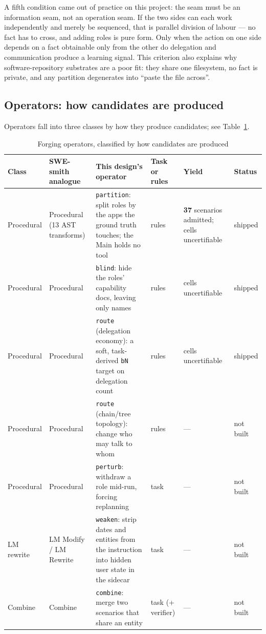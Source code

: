 \documentclass[11pt,a4paper]{article}
\begin{document}
A fifth condition came out of practice on this project: the seam must be an information seam, not an operation seam. If the two sides can each work independently and merely be sequenced, that is parallel division of labour --- no fact has to cross, and adding roles is pure form. Only when the action on one side depends on a fact obtainable only from the other do delegation and communication produce a learning signal. This criterion also explains why software-repository substrates are a poor fit: they share one filesystem, no fact is private, and any partition degenerates into ``paste the file across''.

\subsection{Operators: how candidates are produced}
\label{sec:operators}

Operators fall into three classes by how they produce candidates; see Table~\ref{tab:operators}.

\begin{table}[H]
\centering
\small
\caption{Forging operators, classified by how candidates are produced}
\label{tab:operators}
\begin{tabularx}{\textwidth}{>{\raggedright\arraybackslash}p{1.75cm} >{\raggedright\arraybackslash}p{1.85cm} X >{\raggedright\arraybackslash}p{1.5cm} >{\raggedright\arraybackslash}p{1.85cm} >{\raggedright\arraybackslash}p{1.65cm}}
\toprule
Class & SWE-smith analogue & This design's operator & Task or rules & Yield & Status\\
\midrule
Procedural & Procedural (13 AST transforms) & \texttt{partition}: split roles by the apps the ground truth touches; the Main holds no tool & rules & \textbf{37} scenarios admitted; cells uncertifiable & shipped\\
Procedural & Procedural & \texttt{blind}: hide the roles' capability docs, leaving only names & rules & cells uncertifiable & shipped\\
Procedural & Procedural & \texttt{route} (delegation economy): a soft, task-derived \texttt{bN} target on delegation count & rules & cells uncertifiable & shipped\\
Procedural & Procedural & \texttt{route} (chain/tree topology): change who may talk to whom & rules & --- & not built\\
Procedural & Procedural & \texttt{perturb}: withdraw a role mid-run, forcing replanning & task & --- & not built\\
LM rewrite & LM Modify / LM Rewrite & \texttt{weaken}: strip dates and entities from the instruction into hidden user state in the sidecar & task & --- & not built\\
Combine & Combine & \texttt{combine}: merge two scenarios that share an entity & task (+ verifier) & --- & not built\\
\bottomrule
\end{tabularx}
\end{table}
\end{document}
